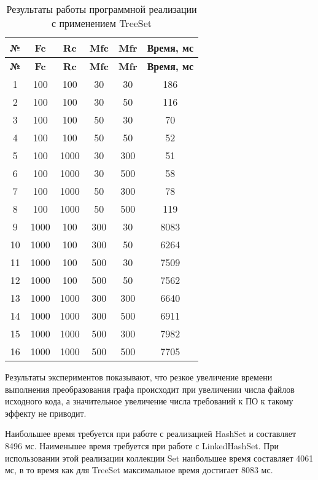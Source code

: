 \begin{longtable}{|c|c|c|c|c|c|}
    \caption{Результаты работы программной реализации с применением TreeSet}
    \label{tab:treeset}\\
    \hline
    \bfseries{№} & \bfseries{Fc} & \bfseries{Rc} & \bfseries{Mfc} & \bfseries{Mfr} & \bfseries{Время, мс} \\
    \hline
    \endfirsthead
    \hline
    \bfseries{№} & \bfseries{Fc} & \bfseries{Rc} & \bfseries{Mfc} & \bfseries{Mfr} & \bfseries{Время, мс} \\
    \hline
    \endhead
    \hline
    1 & 100 & 100 & 30 & 30 & 186 \\
    \hline
    2 & 100 & 100 & 30 & 50 & 116 \\
    \hline
    3 & 100 & 100 & 50 & 30 & 70 \\
    \hline
    4 & 100 & 100 & 50 & 50 & 52 \\
    \hline
    5 & 100 & 1000 & 30 & 300 & 51 \\
    \hline
    6 & 100 & 1000 & 30 & 500 & 58 \\
    \hline
    7 & 100 & 1000 & 50 & 300 & 78 \\
    \hline
    8 & 100 & 1000 & 50 & 500 & 119 \\
    \hline
    9 & 1000 & 100 & 300 & 30 & 8083 \\
    \hline
    10 & 1000 & 100 & 300 & 50 & 6264 \\
    \hline
    11 & 1000 & 100 & 500 & 30 & 7509 \\
    \hline
    12 & 1000 & 100 & 500 & 50 & 7562 \\
    \hline
    13 & 1000 & 1000 & 300 & 300 & 6640 \\
    \hline
    14 & 1000 & 1000 & 300 & 500 & 6911 \\
    \hline
    15 & 1000 & 1000 & 500 & 300 & 7982 \\
    \hline
    16 & 1000 & 1000 & 500 & 500 & 7705 \\
    \hline
\end{longtable}

Результаты экспериментов показывают, что резкое увеличение времени выполнения преобразования графа происходит при увеличении числа файлов исходного кода, а значительное увеличение числа требований к ПО к такому эффекту не приводит.

Наибольшее время требуется при работе с реализацией HashSet и составляет 8496 мс. Наименьшее время требуется при работе с LinkedHashSet. При использовании этой реализации коллекции Set наибольшее время составляет 4061 мс, в то время как для TreeSet максимальное время достигает 8083 мс.